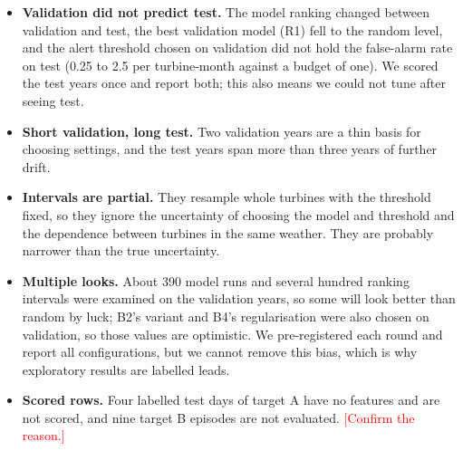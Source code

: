 \documentclass[12pt,a4paper]{article}
\newcommand{\tbc}[1]{\textcolor{red}{[#1]}}
\begin{document}
	\begin{itemize}
		\item \textbf{Validation did not predict test.} The model ranking changed between validation and test, the best validation model (R1) fell to the random level, and the alert threshold chosen on validation did not hold the false-alarm rate on test (0.25 to 2.5 per turbine-month against a budget of one). We scored the test years once and report both; this also means we could not tune after seeing test.
		\item \textbf{Short validation, long test.} Two validation years are a thin basis for choosing settings, and the test years span more than three years of further drift.
		\item \textbf{Intervals are partial.} They resample whole turbines with the threshold fixed, so they ignore the uncertainty of choosing the model and threshold and the dependence between turbines in the same weather. They are probably narrower than the true uncertainty.
		\item \textbf{Multiple looks.} About 390 model runs and several hundred ranking intervals were examined on the validation years, so some will look better than random by luck; B2's variant and B4's regularisation were also chosen on validation, so those values are optimistic. We pre-registered each round and report all configurations, but we cannot remove this bias, which is why exploratory results are labelled leads.
		\item \textbf{Scored rows.} Four labelled test days of target A have no features and are not scored, and nine target B episodes are not evaluated. \tbc{Confirm the reason.}
	\end{itemize}
\end{document}
